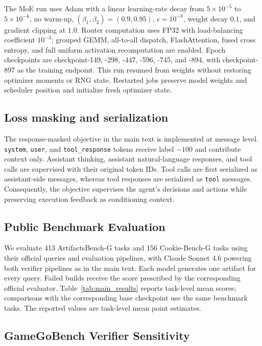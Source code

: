 \documentclass{article}
\begin{document}
The MoE run uses Adam with a linear learning-rate decay from $5\times10^{-5}$ to $5\times10^{-6}$, no warm-up, $(\beta_1,\beta_2)=(0.9,0.95)$, $\epsilon=10^{-8}$, weight decay $0.1$, and gradient clipping at $1.0$. Router computation uses FP32 with load-balancing coefficient $10^{-3}$; grouped GEMM, all-to-all dispatch, FlashAttention, fused cross entropy, and full uniform activation recomputation are enabled. Epoch checkpoints are checkpoint-149, -298, -447, -596, -745, and -894, with checkpoint-897 as the training endpoint. This run resumed from weights without restoring optimizer moments or RNG state. Restarted jobs preserve model weights and scheduler position and initialize fresh optimizer state.

\subsection{Loss masking and serialization}
\label{app:loss_masking}

The response-masked objective in the main text is implemented at message level. \texttt{system}, \texttt{user}, and \texttt{tool\_response} tokens receive label $-100$ and contribute context only. Assistant thinking, assistant natural-language responses, and tool calls are supervised with their original token IDs. Tool calls are first serialized as assistant-side messages, whereas tool responses are serialized as \texttt{tool} messages. Consequently, the objective supervises the agent's decisions and actions while preserving execution feedback as conditioning context.

\subsection{Public Benchmark Evaluation}
\label{app:public_benchmark}

We evaluate 413 ArtifactsBench-G tasks and 156 Cookie-Bench-G tasks using their official queries and evaluation pipelines, with Claude Sonnet 4.6 powering both verifier pipelines as in the main text. Each model generates one artifact for every query. Failed builds receive the score prescribed by the corresponding official evaluator. Table~\ref{tab:main_results} reports task-level mean scores; comparisons with the corresponding base checkpoint use the same benchmark tasks. The reported values are task-level mean point estimates.

\subsection{GameGoBench Verifier Sensitivity}
\label{app:verifier_scope}
\end{document}
